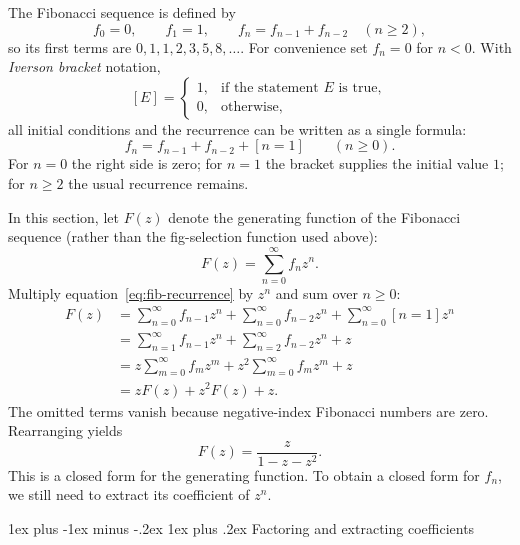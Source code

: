 \documentclass[11pt]{article}
\makeatletter
\renewcommand{\subsection}{\@startsection{subsection}{2}{0mm}%
                                     {1ex plus -1ex minus -.2ex}%
                                     {1ex plus .2ex}%
                                     {\normalfont\large\bfseries}}%
\makeatother
\begin{document}
The Fibonacci sequence is defined by
\[
 f_0=0,\qquad f_1=1,\qquad f_n=f_{n-1}+f_{n-2}\quad(n\geq 2),
\]
so its first terms are $0,1,1,2,3,5,8,\ldots$. For convenience set $f_n=0$
for $n<0$. With \emph{Iverson bracket} notation,
\[
 [E]=\begin{cases}1,&\text{if the statement $E$ is true},\\
                  0,&\text{otherwise},\end{cases}
\]
all initial conditions and the recurrence can be written as a single formula:
\begin{equation}
 f_n=f_{n-1}+f_{n-2}+[n=1]\qquad(n\geq 0).
 \label{eq:fib-recurrence}
\end{equation}
For $n=0$ the right side is zero; for $n=1$ the bracket supplies the initial
value $1$; for $n\geq2$ the usual recurrence remains.

In this section, let $F(z)$ denote the generating function of the Fibonacci
sequence (rather than the fig-selection function used above):
\[
 F(z)=\sum_{n=0}^{\infty}f_nz^n.
\]
Multiply equation~\eqref{eq:fib-recurrence} by $z^n$ and sum over $n\geq 0$:
\begin{align*}
 F(z)
 &=\sum_{n=0}^{\infty}f_{n-1}z^n
   +\sum_{n=0}^{\infty}f_{n-2}z^n
   +\sum_{n=0}^{\infty}[n=1]z^n\\
 &=\sum_{n=1}^{\infty}f_{n-1}z^n
   +\sum_{n=2}^{\infty}f_{n-2}z^n+z\\
 &=z\sum_{m=0}^{\infty}f_mz^m
   +z^2\sum_{m=0}^{\infty}f_mz^m+z\\
 &=zF(z)+z^2F(z)+z.
\end{align*}
The omitted terms vanish because negative-index Fibonacci numbers are zero.
Rearranging yields
\begin{equation}
 \boxed{F(z)=\frac{z}{1-z-z^2}.}
 \label{eq:fib-gf}
\end{equation}
This is a closed form for the generating function. To obtain a closed form for
$f_n$, we still need to extract its coefficient of $z^n$.

\subsection{Factoring and extracting coefficients}
\end{document}
